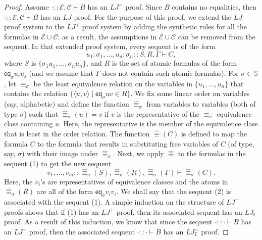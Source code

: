 \documentclass[10pt,a4paper]{article}
\newcommand{\pmLJ}{\mathit{LJ}}
\newcommand{\pmS}{\mathbb S}
\newcommand{\pmEs}{\mathbb E}\newcommand{\pmCs}{\mathbb C}
\newcommand{\pmEa}{\mathcal E}\newcommand{\pmCa}{\mathcal C}
\newcommand{\pmeq}{\mathsf{eq}}
\newcommand{\pmseq}[3]{#1\mathbin{::}#2\vdash #3}
\begin{document}
\begin{proof}
Assume $\pmseq\cdot{\pmEa,\pmCa}B$ has an $\pmLJ^=$ proof. Since $B$ contains no equalities, then $\pmseq\cdot{\pmEa,\pmCa}B$ has an $\pmLJ$ proof. For the purpose of this proof, we extend the $\pmLJ$ proof system to the $\pmLJ^+$ proof system by adding the synthetic rules for all the formulas in $\pmEa\cup\pmCa$: as a result, the assumptions in $\pmEa\cup\pmCa$ can be removed from the sequent. In that extended proof system, every sequent is of the form
\begin{equation}\pmseq{u_1:\sigma_1,\ldots,u_n:\sigma_n}{S,R,\Gamma}C,\tag{1}\end{equation}
where $S$ is $\{\sigma_1u_1,\ldots,\sigma_nu_n\}$, and $R$ is the set of atomic formulas of the form $\pmeq_\sigma u_i u_j$ (and we assume that $\Gamma$ does not contain such atomic formulas). For $\sigma\in\pmS$, let $\equiv_\sigma$ be the least equivalence relation on the variables in $\{u_1,\ldots,u_n\}$ that contains the relation $\{\langle u,v\rangle\mid\pmeq_\sigma u v\in R\}$. We fix some linear order on variables (say, alphabetic) and define the function $\widehat{\equiv}_\sigma$ from variables to variables (both of type $\sigma$) such that $\widehat{\equiv}_\sigma(u)=v$ if $v$ is the representative of the $\equiv_\sigma$-equivalence class containing $u$. Here, the representative is the member of the equivalence class that is least in the order relation. The function $\widehat{\equiv}(C)$ is defined to map the formula $C$ to the formula that results in substituting free variables of $C$ (of type, say, $\sigma$) with their image under $\widehat{\equiv}_\sigma$. Next, we apply $\widehat{\equiv}$ to the formulas in the sequent (1) to get the new sequent
\begin{equation}\pmseq{v_1,\ldots,v_m}{\widehat{\equiv}_\sigma(S),\widehat{\equiv}_\sigma(R),\widehat{\equiv}_\sigma(\Gamma)}{\widehat{\equiv}_\sigma(C)}.\tag{2}\end{equation}
Here, the $v_i$'s are representatives of equivalence classes and the atoms in $\widehat{\equiv}_\sigma(R)$ are all of the form $\pmeq_\sigma v_i v_i$. We shall say that the sequent (2) is associated with the sequent (1).
A simple induction on the structure of $\pmLJ^+$ proofs shows that if (1) has an $\pmLJ^+$ proof, then its associated sequent has an $\pmLJ_{\pmEs}$ proof. As a result of this induction, we know that since the sequent $\pmseq\cdot\cdot B$ has an $\pmLJ^=$ proof, then the associated sequent $\pmseq\cdot\cdot B$ has an $\pmLJ^=_{\pmEs}$ proof.
\end{proof}
\end{document}
